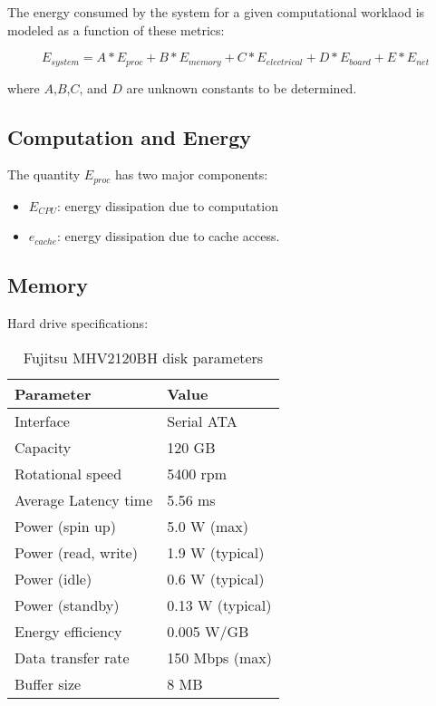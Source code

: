 \documentclass[times, 10pt,onecolumn]{article}
\begin{document}
The energy consumed by the system for a given computational worklaod is
modeled as a function of these metrics:

\begin{equation}
\label{eq:linmodel}
E_{system}=  A*E_{proc}+B*E_{memory}+C*E_{electrical}+D*E_{board}+E*E_{net}
\end{equation}

where $A$,$B$,$C$, and $D$ are unknown constants to be determined. 

\subsection{Computation and Energy}
\label{sec:cpuentropy}
The quantity $E_{proc}$ has two major components:
\begin{itemize}
\item $E_{CPU}$: energy dissipation due to computation
\item $e_{cache}$: energy dissipation due to cache access.
\end{itemize}

\subsection{Memory}
\label{sec:memoryenergy}
Hard drive specifications:


\begin{table}[h!t!]
\caption{Fujitsu MHV2120BH disk parameters}
\begin{tabular}{ l l }
\hline 
\hline
Parameter & Value \\
\hline
  Interface & Serial ATA  \\
  Capacity & 120 GB  \\
  Rotational speed & 5400 rpm  \\
  Average Latency time & 5.56 ms  \\
  Power (spin up) & 5.0 W (max)  \\
  Power (read, write) & 1.9 W (typical)  \\
  Power (idle) & 0.6 W (typical)  \\
  Power (standby) & 0.13 W (typical)  \\
  Energy efficiency & 0.005 W/GB  \\
  Data transfer rate & 150 Mbps (max)  \\
  Buffer size & 8 MB  \\
\hline \hline
\end{tabular}
\label{table1}
\end{table}
\end{document}
